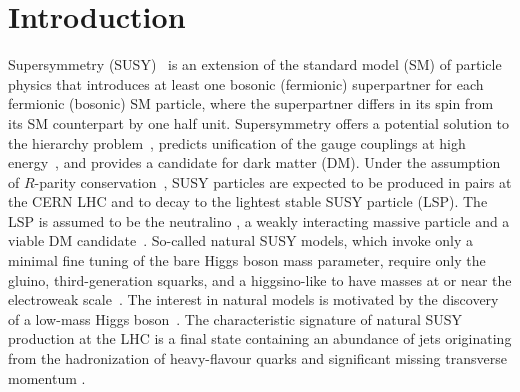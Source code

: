 \maketitle


\section{Introduction}
\label{sec:introduction}

Supersymmetry (SUSY)~\cite{ref:SUSY-1, ref:SUSY0, ref:SUSY3,
  ref:SUSY1} is an extension of the standard model (SM) of particle
physics that introduces at least one bosonic (fermionic) superpartner
for each fermionic (bosonic) SM particle, where the superpartner
differs in its spin from its SM counterpart by one half unit.
Supersymmetry offers a potential solution to the hierarchy
problem~\cite{ref:hierarchy1, ref:hierarchy2}, predicts unification of
the gauge couplings at high energy~\cite{Dimopoulos:1981yj,
  Ibanez:1981yh, Marciano:1981un}, and provides a candidate for dark
matter (DM). Under the assumption of $R$-parity
conservation~\cite{Farrar:1978xj}, SUSY particles are expected to be
produced in pairs at the CERN LHC and to decay to the lightest stable SUSY
particle (LSP). The LSP is assumed to be the neutralino \PSGczDo, a
weakly interacting massive particle and a viable DM
candidate~\cite{Jungman:1995df, 1674-1137-38-9-090001}.  So-called
natural SUSY models, which invoke only a minimal fine tuning of the bare
Higgs boson mass parameter, require only the gluino, third-generation
squarks, and a higgsino-like \PSGczDo to have masses at or near the electroweak
scale~\cite{ref:barbierinsusy}. The interest in natural models is
motivated by the discovery of a low-mass Higgs
boson~\cite{Aad:2012tfa, Chatrchyan:2012ufa, Chatrchyan:2013lba,
  Khachatryan:2014jba, Aad:2014aba, Aad:2015zhl}. The characteristic
signature of natural SUSY production at the LHC is a final state
containing an abundance of jets originating from the hadronization of
heavy-flavour quarks and significant missing transverse momentum
\ptvecmiss.


